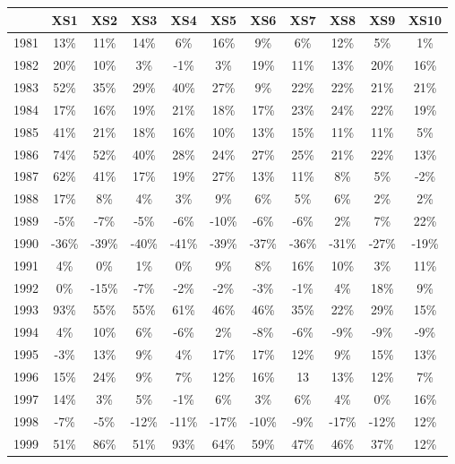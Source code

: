 \documentclass[11pt]{article}
\begin{document}
\begin{table}[H]
    \centering
    \begin{tabular}{ccccccccccc}
    \toprule\toprule
    & \textbf{XS1} & \textbf{XS2} & \textbf{XS3} & \textbf{XS4} & \textbf{XS5} & \textbf{XS6} & \textbf{XS7} & \textbf{XS8} & \textbf{XS9} & \textbf{XS10}\\ 
    \midrule
    1981 & 13\% & 11\% & 14\% & 6\% & 16\% & 9\% & 6\% & 12\% & 5\% & 1\% \\
    1982 & 20\% & 10\% & 3\% & -1\% & 3\% & 19\% & 11\% & 13\% & 20\% & 16\% \\
    1983 & 52\% & 35\% & 29\% & 40\% & 27\% & 9\% & 22\% & 22\% & 21\% & 21\% \\
    1984 & 17\% & 16\% & 19\% & 21\% & 18\% & 17\% & 23\% & 24\% & 22\% & 19\% \\ 
    1985 & 41\% & 21\% & 18\% & 16\% & 10\% & 13\% & 15\% & 11\% & 11\% & 5\% \\ 
    1986 & 74\% & 52\% & 40\% & 28\% & 24\% & 27\% & 25\% & 21\% & 22\% & 13\% \\
    1987 & 62\% & 41\% & 17\% & 19\% & 27\% & 13\% & 11\% & 8\% & 5\% & -2\% \\
    1988 & 17\% & 8\% & 4\% & 3\% & 9\% & 6\% & 5\% & 6\% & 2\% & 2\% \\
    1989 & -5\% & -7\% & -5\% & -6\% & -10\% & -6\% & -6\% & 2\% & 7\% & 22\% \\
    \rowcolor{myred} 1990 & -36\% & -39\% & -40\% & -41\% & -39\% & -37\% & -36\% & -31\% & -27\% & -19\% \\
    1991 & 4\% & 0\% & 1\% & 0\% & 9\% & 8\% & 16\% & 10\% & 3\% & 11\% \\
    1992 & 0\% & -15\% & -7\% & -2\% & -2\% & -3\% & -1\% & 4\% & 18\% & 9\% \\
    1993 & 93\% & 55\% & 55\% & 61\% & 46\% & 46\% & 35\% & 22\% & 29\% & 15\% \\
    1994 & 4\% & 10\% & 6\% & -6\% & 2\% & -8\% & -6\% & -9\% & -9\% & -9\% \\
    1995 & -3\% & 13\% & 9\% & 4\% & 17\% & 17\% & 12\% & 9\% & 15\% & 13\% \\
    1996 & 15\% & 24\% & 9\% & 7\% & 12\% & 16\% & 13 & 13\% & 12\% & 7\% \\
    1997 & 14\% & 3\% & 5\% & -1\% & 6\% & 3\% & 6\% & 4\% & 0\% & 16\% \\
    1998 & -7\% & -5\% & -12\% & -11\% & -17\% & -10\% & -9\% & -17\% & -12\% & 12\% \\
    \rowcolor{myblue} 1999 & 51\% & 86\% & 51\% & 93\% & 64\% & 59\% & 47\% & 46\% & 37\% & 12\% \\

\end{tabular}
\end{table}
\end{document}
